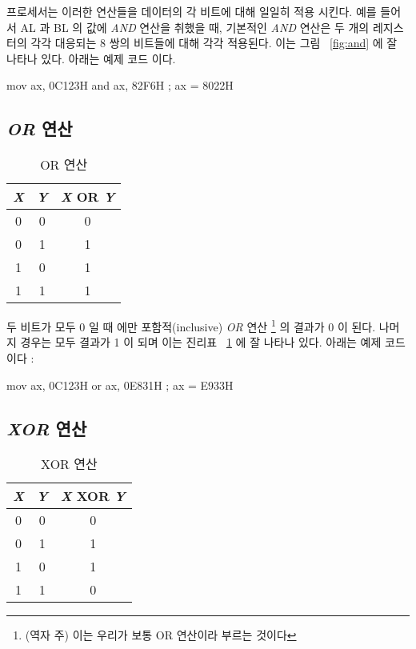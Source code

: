 프로세서는 이러한 연산들을 데이터의 각 비트에 대해 일일히 적용 시킨다. 예를
들어서 {\code AL} 과 {\code BL} 의 값에 \emph{AND} 연산을 취했을 때, 
기본적인 \emph{AND} 연산은 두 개의 레지스터의 각각 대응되는 8 쌍의 비트들에 
대해 각각 적용된다. 이는 그림 ~\ref{fig:and} 에 잘 나타나 있다. 아래는 예제
코드 이다. 

\begin{AsmCodeListing}[frame=none]
      mov    ax, 0C123H
      and    ax, 82F6H          ; ax = 8022H
\end{AsmCodeListing}

\subsection{\emph{OR} 연산}

\begin{table}[t]
\centering
\begin{tabular}{|c|c|c|}
\hline
\emph{X} & \emph{Y} & \emph{X} OR \emph{Y} \\
\hline \hline
0 & 0 & 0 \\
0 & 1 & 1 \\
1 & 0 & 1 \\
1 & 1 & 1 \\
\hline
\end{tabular}
\caption{OR 연산 \label{tab:or} }
\end{table}

두 비트가 모두 0 일 때 에만 포함적(inclusive) \emph{OR} 연산
\footnote{(역자 주) 이는 우리가 보통 OR 연산이라 부르는 것이다}
의 결과가 0 이 된다. 나머지 경우는
모두 결과가 1 이 되며 이는 진리표 ~\ref{tab:or} 에 잘 나타나 있다. 아래는 예제 
코드 이다 :

\begin{AsmCodeListing}[frame=none]
      mov    ax, 0C123H
      or     ax, 0E831H          ; ax = E933H
\end{AsmCodeListing}

\subsection{\emph{XOR} 연산 }

\begin{table}
\centering
\begin{tabular}{|c|c|c|}
\hline
\emph{X} & \emph{Y} & \emph{X} XOR \emph{Y} \\
\hline \hline
0 & 0 & 0 \\
0 & 1 & 1 \\
1 & 0 & 1 \\
1 & 1 & 0 \\
\hline
\end{tabular}
\caption{XOR 연산 \label{tab:xor}}
\end{table}

